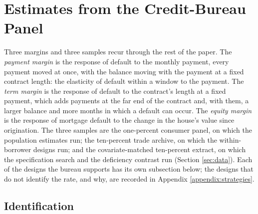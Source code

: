 \section{Estimates from the Credit-Bureau Panel}\label{sec:autodata}

Three margins and three samples recur through the rest of the paper. The \emph{payment margin} is the response of default to the monthly payment, every payment moved at once, with the balance moving with the payment at a fixed contract length: the elasticity of default within a window to the payment. The \emph{term margin} is the response of default to the contract's length at a fixed payment, which adds payments at the far end of the contract and, with them, a larger balance and more months in which a default can occur. The \emph{equity margin} is the response of mortgage default to the change in the house's value since origination. The three samples are the one-percent consumer panel, on which the population estimates run; the ten-percent trade archive, on which the within-borrower designs run; and the covariate-matched ten-percent extract, on which the specification search and the deficiency contrast run (Section \ref{sec:data}). Each of the designs the bureau supports has its own subsection below; the designs that do not identify the rate, and why, are recorded in Appendix \ref{appendix:strategies}.

\subsection{Identification}\label{sec:identification}

